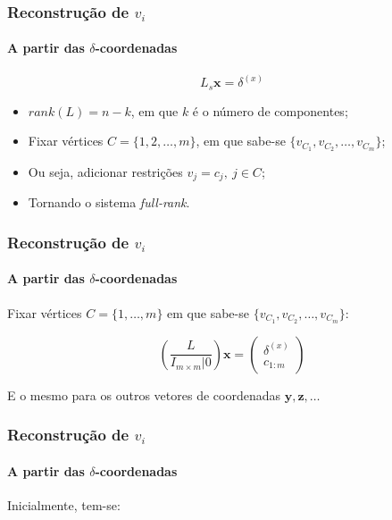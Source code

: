 \begin{frame}
\frametitle{Reconstrução de $v_i$}
\framesubtitle{A partir das $\delta$-coordenadas}

$$L_s \textbf{x} = \delta^{(x)}$$

\begin{itemize}
	\item $rank(L) = n - k$, em que $k$ é o número de componentes;
	\item Fixar vértices $C = \{1, 2, \dots, m\}$, em que sabe-se $\{v_{C_1}, v_{C_2}, \dots, v_{C_m}\}$;
	\item Ou seja, adicionar restrições $v_{j} = c_j,\ j \in C$;
	\item Tornando o sistema \textit{full-rank}.
\end{itemize}

\end{frame}


\begin{frame}
\frametitle{Reconstrução de $v_i$}
\framesubtitle{A partir das $\delta$-coordenadas}

Fixar vértices $C = \{1, \dots, m\}$ em que sabe-se $\{v_{C_1}, v_{C_2}, \dots, v_{C_m}\}$:

\bigskip

$$\left(\frac{L}{I_{m\times m} | 0}\right) \textbf{x} = \begin{pmatrix}
	\delta^{(x)} \\
	c_{1:m}
\end{pmatrix}$$

\bigskip
E o mesmo para os outros vetores de coordenadas $\mathbf{y, z, \dots}$
\medskip

\smallskip

\end{frame}


\begin{frame}
\frametitle{Reconstrução de $v_i$}
\framesubtitle{A partir das $\delta$-coordenadas}


Inicialmente, tem-se:

\bigskip

\begin{center}
\end{center}

\bigskip
\medskip
\smallskip

\end{frame}

